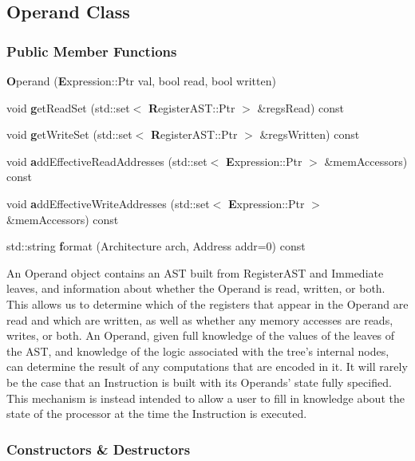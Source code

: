 \subsection{Operand Class}
\label{classDyninst_1_1InstructionAPI_1_1Operand}
\subsubsection*{Public Member Functions}
\begin{DoxyCompactItemize}
\item 
{\textbf Operand} ({\textbf Expression::Ptr} val, bool read, bool written)
\item 
 void {\textbf getReadSet} (std::set$<$ {\textbf RegisterAST::Ptr} $>$ \&regsRead) const 
\item 
 void {\textbf getWriteSet} (std::set$<$ {\textbf RegisterAST::Ptr} $>$ \&regsWritten) const 
\item 
 void {\textbf addEffectiveReadAddresses} (std::set$<$ {\textbf Expression::Ptr} $>$ \&memAccessors) const 
\item 
 void {\textbf addEffectiveWriteAddresses} (std::set$<$ {\textbf Expression::Ptr} $>$ \&memAccessors) const 
\item 
 std::string {\textbf format} (Architecture arch, Address addr=0) const 
\end{DoxyCompactItemize}



An Operand object contains an AST built from RegisterAST and Immediate leaves, and information about whether the Operand is read, written, or both. This allows us to determine which of the registers that appear in the Operand are read and which are written, as well as whether any memory accesses are reads, writes, or both. An Operand, given full knowledge of the values of the leaves of the AST, and knowledge of the logic associated with the tree's internal nodes, can determine the result of any computations that are encoded in it. It will rarely be the case that an Instruction is built with its Operands' state fully specified. This mechanism is instead intended to allow a user to fill in knowledge about the state of the processor at the time the Instruction is executed. 

\subsubsection{Constructors \& Destructors}
